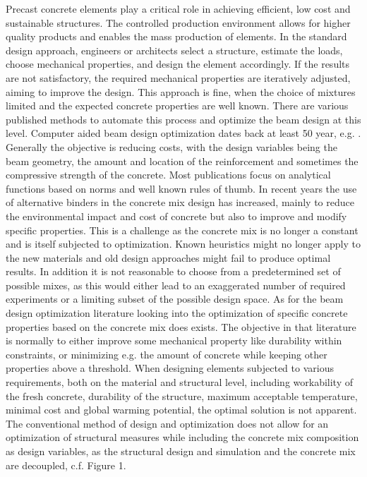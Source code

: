 Precast concrete elements play a critical role in achieving efficient, low cost and sustainable structures.
The controlled production environment allows for higher quality products and enables the mass production of elements.
In the standard design approach, engineers or architects select a structure, estimate the loads, choose mechanical properties, and design the element accordingly. 
If the results are not satisfactory, the required mechanical properties are iteratively adjusted, aiming to improve the design.
This approach is fine, when the choice of mixtures limited and the expected concrete properties are well known.
There are various published methods to automate this process and optimize the beam design at this level.
Computer aided beam design optimization dates back  at least 50 year, e.g. \cite{Haung1967}.
Generally the objective is reducing costs, with the design variables being the beam geometry, the amount and location of the reinforcement and sometimes the compressive strength of the concrete.
Most publications focus on analytical functions based on norms and well known rules of thumb.
In recent years the use of alternative binders in the concrete mix design has increased, mainly to reduce the environmental impact and cost of concrete but also to improve and modify specific properties.
This is a challenge as the concrete mix is no longer a constant and is itself subjected to optimization.
Known heuristics might no longer apply to the new materials and old design approaches might fail to produce optimal results.
In addition it is not reasonable to choose from a predetermined set of possible mixes, as this would either lead to an exaggerated number of required experiments or a limiting subset of the possible design space.
As for the beam design optimization literature looking into the optimization of specific concrete properties based on the concrete mix does exists.
The objective in that literature is normally to either improve some mechanical property like durability within constraints, or minimizing e.g. the amount of concrete while keeping other properties above a threshold.
When designing elements subjected to various requirements, both on the material and structural level, including workability of the fresh concrete, durability of the structure, maximum acceptable temperature, minimal cost and global warming potential, the optimal solution is not apparent.
The conventional method of design and optimization does not allow for an optimization of structural measures while including the concrete mix composition as design variables, as the structural design and simulation and the concrete mix are decoupled, c.f. Figure 1.
